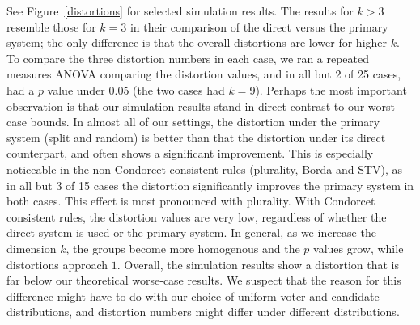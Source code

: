 \documentclass[letterpaper]{article} %
\theoremstyle{definition}
\begin{document}
See Figure~\ref{distortions} for selected simulation results. The results for $k > 3$ resemble those for $k=3$ in their comparison of the direct versus the primary system; the only difference is that the overall distortions are lower for higher $k$. To compare the three distortion numbers in each case, we ran a repeated measures ANOVA comparing the distortion values, and in all but 2 of 25 cases, had a $p$ value under $0.05$ (the two cases had $k=9$).
Perhaps the most important observation is that our simulation results stand in direct contrast to our worst-case bounds. In almost all of our settings, the distortion under the primary system (split and random) is better than that the distortion under its direct counterpart, and often shows a significant improvement. This is especially noticeable in the non-Condorcet consistent rules (plurality, Borda and STV), as in all but 3 of 15 cases the distortion significantly improves the primary system in both cases. This effect is most pronounced with plurality. With Condorcet consistent rules, the distortion values are very low, regardless of whether the direct system is used or the primary system. In general, as we increase the dimension $k$, the groups become more homogenous and the $p$ values grow, while distortions  approach $1$.
Overall, the simulation results show a distortion that is far below our theoretical worse-case results. We suspect that the reason for this difference might have to do with our choice of uniform voter and candidate distributions, and distortion numbers might differ under different distributions.
\end{document}
